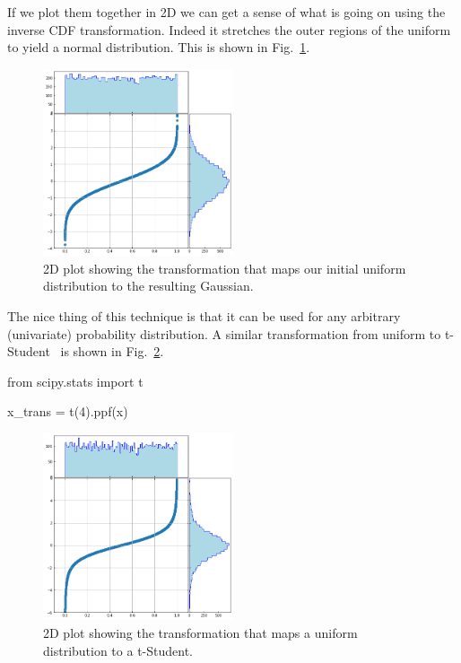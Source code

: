 If we plot them together in 2D we can get a sense of what is going on using the inverse CDF transformation. Indeed it stretches the outer regions of the uniform to yield a normal distribution. This is shown in Fig.~\ref{fig:uniform_to_gauss}. 
    
\begin{figure}[htbp]
\centering
\includegraphics[width=0.5\textwidth]{figures/uniform_to_gauss}
\caption{2D plot showing the transformation that maps our initial uniform distribution to the resulting Gaussian.}
\label{fig:uniform_to_gauss}
\end{figure}
    
The nice thing of this technique is that it can be used for any arbitrary (univariate) probability distribution. A similar transformation from uniform to t-Student~\cite{bib:t_student} is shown in Fig.~\ref{fig:uniform_to_tstudent}.

\begin{ipython}
from scipy.stats import t

x_trans = t(4).ppf(x)
\end{ipython}

\begin{figure}[htbp]
\centering
\includegraphics[width=0.5\textwidth]{figures/tstudent_to_uniform}
\caption{2D plot showing the transformation that maps a uniform distribution to a t-Student.}
\label{fig:uniform_to_tstudent}
\end{figure}

